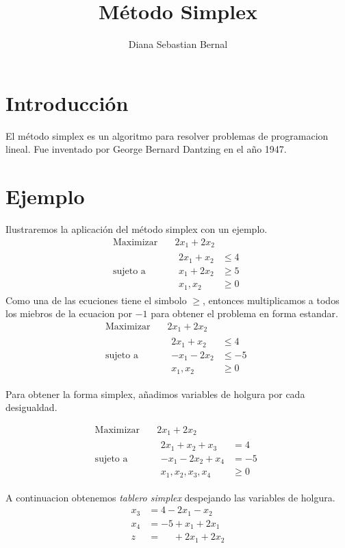 \documentclass{article}
\title{Método Simplex}
\author{Diana Sebastian Bernal}
\begin{document}
\maketitle

\section{Introducción}
\label{sec:introduccion}

El método simplex es un algoritmo para resolver problemas de
programacion lineal. Fue inventado por George Bernard Dantzing en el
año 1947.

\section{Ejemplo}
\label{sec:ejemplo}

Ilustraremos la aplicación del método simplex con un ejemplo.
\begin{equation*}
 \begin{aligned}
\text{Maximizar} \quad & 2x_{1}+2x_{2}\\
\text{sujeto a} \quad &
  \begin{aligned}
   2x_1+x_{2} &\leq 4\\
   x_{1}+2x_{2} &\geq 5\\
    x_{1},x_{2} &\geq 0
  \end{aligned}
\end{aligned}

\end{equation*}
Como una de las ecuciones tiene el simbolo $\geq$, entonces
multiplicamos a todos los miebros de la ecuacion por $-1$ para obtener
el problema en forma estandar.
\begin{equation*}
 \begin{aligned}
\text{Maximizar} \quad & 2x_{1}+2x_{2}\\
\text{sujeto a} \quad &
  \begin{aligned}
   2x_1+x_{2} &\leq 4\\
 -x_{1}-2x_{2} &\leq -5\\
    x_{1},x_{2} &\geq 0
  \end{aligned}
\end{aligned}
\end{equation*}

Para obtener la forma simplex, añadimos variables de holgura por cada
desigualdad.

\begin{equation*}
 \begin{aligned}
\text{Maximizar} \quad & 2x_{1}+2x_{2}\\
\text{sujeto a} \quad &
  \begin{aligned}
   2x_1+x_{2}+x_{3} &= 4\\
   -x_{1}-2x_{2}    +x_{4} &=-5\\
    x_{1},x_{2},x_{3},x_{4} &\geq 0
  \end{aligned}
\end{aligned}
\end{equation*}

A continuacion obtenemos \emph{tablero simplex} despejando las
variables de holgura.
\begin{equation*}
 \begin{aligned}
   x_3 &=4-2x_1-x_2\\
   x_4  &=-5+x_1+2x_1\\
   \hline
   z &=\phantom{-5}+2x_{1}+2x_{2}
  \end{aligned}

\end{equation*}
\end{document}
